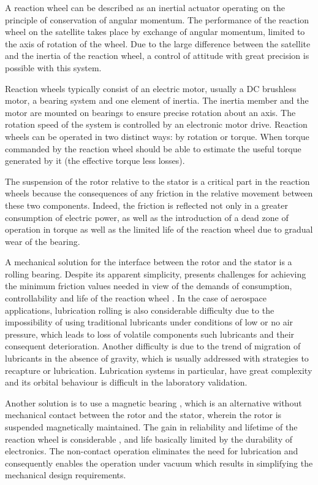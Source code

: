 \documentclass[10pt,fleqn,a4paper,twoside]{article}
\begin{document}
	A reaction wheel can be described as an inertial actuator operating on the principle of conservation of angular momentum. The performance of the reaction wheel on the satellite takes place by exchange of angular momentum, limited to the axis of rotation of the wheel. Due to the large difference between the satellite and the inertia of the reaction wheel, a control of attitude with great precision is possible with this system.
	
	Reaction wheels typically consist of an electric motor, usually a DC brushless motor, a bearing system and one element of inertia. The inertia member and the motor are mounted on bearings to ensure precise rotation about an axis. The rotation speed of the system is controlled by an electronic motor drive. Reaction wheels can be operated in two distinct ways: by rotation or torque. When torque commanded by the reaction wheel should be able to estimate the useful torque generated by it (the effective torque less losses).
	
	The suspension of the rotor relative to the stator is a critical part in the reaction wheels \cite{taniwaki2003experimental} because the consequences of any friction in the relative movement between these two components. Indeed, the friction is reflected not only in a greater consumption of electric power, as well as the introduction of a dead zone of operation in torque as well as the limited life of the reaction wheel due to gradual wear of the bearing.
	
	A  mechanical solution for the interface between the rotor and the stator is a rolling bearing. Despite its apparent simplicity, presents challenges for achieving the minimum friction values needed in view of the demands of consumption, controllability and life of the reaction wheel \cite{Krishnan2010}. In the case of aerospace applications, lubrication rolling is also considerable difficulty due to the impossibility of using traditional lubricants under conditions of low or no air pressure, which leads to loss of volatile components such lubricants and their consequent deterioration. Another difficulty is due to the trend of migration of lubricants in the absence of gravity, which is usually addressed with strategies to recapture or lubrication. Lubrication systems in particular, have great complexity and its orbital behaviour is difficult in the laboratory validation.
	
	Another solution is to use a magnetic bearing \cite{Bangcheng2012}, which is an alternative without mechanical contact between the rotor and the stator, wherein the rotor is suspended magnetically maintained. The gain in reliability and lifetime of the reaction wheel is considerable \cite{Marble2006}, and life basically limited by the durability of electronics. The non-contact operation eliminates the need for lubrication and consequently enables the operation under vacuum which results in simplifying the mechanical design requirements.
	
\end{document}
